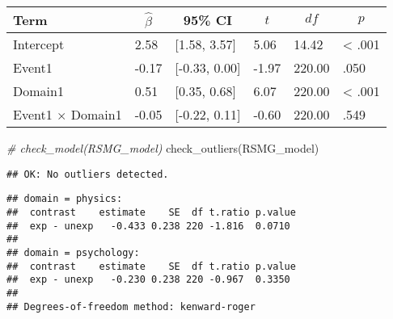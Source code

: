 \documentclass[
]{article}
\newenvironment{Shaded}{\begin{snugshade}}{\end{snugshade}}
\newcommand{\CommentTok}[1]{\textcolor[rgb]{0.56,0.35,0.01}{\textit{#1}}}
\newcommand{\FunctionTok}[1]{\textcolor[rgb]{0.00,0.00,0.00}{#1}}
\newcommand{\NormalTok}[1]{#1}
\newcommand{\SpecialCharTok}[1]{\textcolor[rgb]{0.00,0.00,0.00}{#1}}
\begin{document}
\begin{table}[tbp]

\begin{center}
\begin{threeparttable}

\caption{\label{tab:unnamed-chunk-12}}

\begin{tabular}{llllll}
\toprule
Term & \multicolumn{1}{c}{$\hat{\beta}$} & \multicolumn{1}{c}{95\% CI} & \multicolumn{1}{c}{$t$} & \multicolumn{1}{c}{$\mathit{df}$} & \multicolumn{1}{c}{$p$}\\
\midrule
Intercept & 2.58 & {}[1.58, 3.57] & 5.06 & 14.42 & < .001\\
Event1 & -0.17 & {}[-0.33, 0.00] & -1.97 & 220.00 & .050\\
Domain1 & 0.51 & {}[0.35, 0.68] & 6.07 & 220.00 & < .001\\
Event1 $\times$ Domain1 & -0.05 & {}[-0.22, 0.11] & -0.60 & 220.00 & .549\\
\bottomrule
\end{tabular}

\end{threeparttable}
\end{center}

\end{table}

\begin{Shaded}
\begin{Highlighting}[]
\CommentTok{\# check\_model(RSMG\_model)}
\FunctionTok{check\_outliers}\NormalTok{(RSMG\_model)}
\end{Highlighting}
\end{Shaded}

\begin{verbatim}
## OK: No outliers detected.
\end{verbatim}

\begin{Shaded}
\end{Shaded}

\begin{verbatim}
## domain = physics:
##  contrast    estimate    SE  df t.ratio p.value
##  exp - unexp   -0.433 0.238 220 -1.816  0.0710 
## 
## domain = psychology:
##  contrast    estimate    SE  df t.ratio p.value
##  exp - unexp   -0.230 0.238 220 -0.967  0.3350 
## 
## Degrees-of-freedom method: kenward-roger
\end{verbatim}
\end{document}
